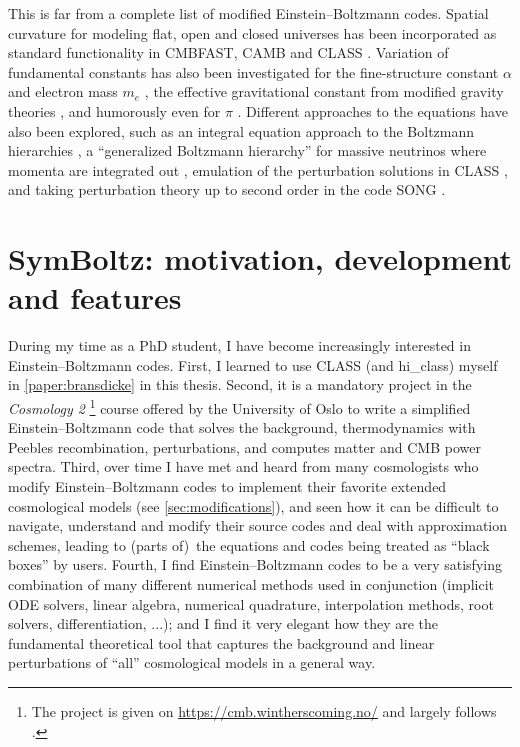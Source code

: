 \documentclass[USenglish, thumbmarks]{uiophdthesis} %
\newcommand\EB{Einstein--Boltzmann}
\begin{document}
This is far from a complete list of modified \EB{} codes.
Spatial curvature for modeling flat, open and closed universes has been incorporated as standard functionality in CMBFAST, CAMB and CLASS \cite{zaldarriagaIntegralSolutionMicrowave1998,zaldarriagaCMBFASTSpatiallyClosed2000,lewisEfficientComputationCMB2000a,lesgourguesFastAccurateCMB2014,pitrouOptimalBoltzmannHierarchies2020a}.
Variation of fundamental constants has also been investigated for the
fine-structure constant $\alpha$ and electron mass $m_e$ \cite[e.g.][]{hartNewConstraintsTimedependent2018,chlubaVaryingFundamentalConstants2024},
the effective gravitational constant from modified gravity theories \cite[e.g.][]{ballardiniCosmologicalConstraintsGravitational2022},
and humorously even for $\pi$ \cite{gammalCircularReasoningSolving2024}.
Different approaches to the equations have also been explored, such as
an integral equation approach to the Boltzmann hierarchies \cite{kamionkowskiCosmologicalPerturbationsBoltzmann2021a,noncoldwithouthierarchy,leeRapidAccurateNumerical2025a,leeCosmologicalEvolutionDecaying2026},
a \enquote{generalized Boltzmann hierarchy} for massive neutrinos where momenta are integrated out \cite{nascimentoGeneralizedBoltzmannHierarchy2021},
emulation of the perturbation solutions in CLASS \cite{albersCosmicNetPhysicsdrivenImplementation2019,guntherCosmicNetIIEmulating2022},
and taking perturbation theory up to second order in the code SONG \cite{pettinariIntrinsicBispectrumCosmic2013,pettinariIntrinsicBispectrumCosmic2016,pettinariImpactPolarisationIntrinsic2014}.

\section{SymBoltz: motivation, development and features}
\label{sec:symboltz}

During my time as a PhD student, I have become increasingly interested in \EB{} codes.
First, I learned to use CLASS (and hi\_class) myself in \cref{paper:bransdicke} in this thesis.
Second, it is a mandatory project in the \textit{Cosmology 2}%
\footnote{The project is given on \url{https://cmb.wintherscoming.no/} and largely follows \cite{callinHowCalculateCMB2006b}.}
course offered by the University of Oslo to write a simplified \EB{} code
that solves the background, thermodynamics with Peebles recombination, perturbations, and computes matter and CMB power spectra.
Third, over time I have met and heard from many cosmologists who modify \EB{} codes to implement their favorite extended cosmological models (see \cref{sec:modifications}),
and seen how it can be difficult to navigate, understand and modify their source codes and deal with approximation schemes,
leading to (parts of) the equations and codes being treated as \enquote{black boxes} by users.
Fourth, I find \EB{} codes to be a very satisfying combination of many different numerical methods used in conjunction (implicit ODE solvers, linear algebra, numerical quadrature, interpolation methods, root solvers, differentiation, ...);
and I find it very elegant how they are the fundamental theoretical tool that captures the background and linear perturbations of \enquote{all} cosmological models in a general way.
\end{document}
